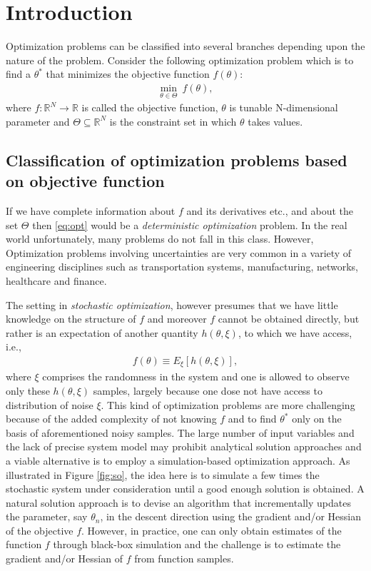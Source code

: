 \chapter{Introduction}
Optimization problems can be classified into several branches depending upon the nature of the problem. Consider the following optimization problem which is to find a $\theta^{*}$ that minimizes the objective function $f(\theta)$:
\begin{align}\label{eq:opt}
 \underset{\theta \in \Theta}{\min} ~f(\theta),
\end{align}
where $f \colon \mathbb{R}^N \to \mathbb{R}$ is called the objective function, $\theta$ is tunable N-dimensional parameter and $\Theta \subseteq \mathbb{R}^N$ is the constraint set in which $\theta$ takes values. 
\section{Classification of optimization problems based on objective function}\label{sc:objclass}
If we have complete information about $f$ and its derivatives etc., and about the set $\Theta$ then \eqref{eq:opt} would be a \emph{deterministic optimization} problem. In the real world unfortunately, many problems do not fall in this class. However, Optimization problems involving uncertainties are very common in a variety of engineering disciplines such as transportation systems, manufacturing, networks, healthcare and finance.

The setting in \emph{stochastic optimization}, however presumes that we have little knowledge on the structure of $f$ and moreover $f$ cannot be obtained directly, but rather is an expectation of another quantity $h(\theta,\xi)$, to which we have access, i.e.,
\begin{align}\label{eq:stopt}
 f(\theta) \equiv E_{\xi}[h(\theta,\xi)], 
\end{align}
 where $\xi$ comprises the randomness in the system and one is allowed to observe only these $h(\theta,\xi)$ samples, largely  because one dose not have access to distribution of noise $\xi$. This kind of optimization problems are more challenging because of the added complexity of not knowing $f$ and to find $\theta^{*}$ only on the basis of aforementioned noisy samples. The large number of input variables and the lack of precise system model may prohibit analytical solution approaches and a viable alternative is to employ a simulation-based optimization approach. As illustrated in Figure \ref{fig:so}, the idea here is to simulate a few times the stochastic system under consideration until a good enough solution is obtained. A natural solution approach is to devise an algorithm that incrementally updates the parameter, say $\theta_n$, in the descent direction using the gradient and/or Hessian of the objective $f$. However, in practice, one can only obtain estimates of the function $f$ through black-box simulation and the challenge is to estimate the gradient and/or Hessian of $f$ from function samples. \par

